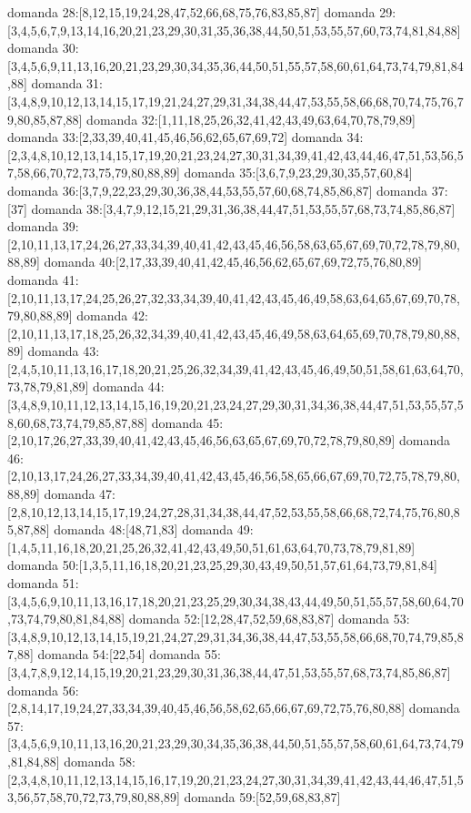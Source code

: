 domanda 28:[8,12,15,19,24,28,47,52,66,68,75,76,83,85,87]
domanda 29:[3,4,5,6,7,9,13,14,16,20,21,23,29,30,31,35,36,38,44,50,51,53,55,57,60,73,74,81,84,88]
domanda 30:[3,4,5,6,9,11,13,16,20,21,23,29,30,34,35,36,44,50,51,55,57,58,60,61,64,73,74,79,81,84,88]
domanda 31:[3,4,8,9,10,12,13,14,15,17,19,21,24,27,29,31,34,38,44,47,53,55,58,66,68,70,74,75,76,79,80,85,87,88]
domanda 32:[1,11,18,25,26,32,41,42,43,49,63,64,70,78,79,89]
domanda 33:[2,33,39,40,41,45,46,56,62,65,67,69,72]
domanda 34:[2,3,4,8,10,12,13,14,15,17,19,20,21,23,24,27,30,31,34,39,41,42,43,44,46,47,51,53,56,57,58,66,70,72,73,75,79,80,88,89]
domanda 35:[3,6,7,9,23,29,30,35,57,60,84]
domanda 36:[3,7,9,22,23,29,30,36,38,44,53,55,57,60,68,74,85,86,87]
domanda 37:[37]
domanda 38:[3,4,7,9,12,15,21,29,31,36,38,44,47,51,53,55,57,68,73,74,85,86,87]
domanda 39:[2,10,11,13,17,24,26,27,33,34,39,40,41,42,43,45,46,56,58,63,65,67,69,70,72,78,79,80,88,89]
domanda 40:[2,17,33,39,40,41,42,45,46,56,62,65,67,69,72,75,76,80,89]
domanda 41:[2,10,11,13,17,24,25,26,27,32,33,34,39,40,41,42,43,45,46,49,58,63,64,65,67,69,70,78,79,80,88,89]
domanda 42:[2,10,11,13,17,18,25,26,32,34,39,40,41,42,43,45,46,49,58,63,64,65,69,70,78,79,80,88,89]
domanda 43:[2,4,5,10,11,13,16,17,18,20,21,25,26,32,34,39,41,42,43,45,46,49,50,51,58,61,63,64,70,73,78,79,81,89]
domanda 44:[3,4,8,9,10,11,12,13,14,15,16,19,20,21,23,24,27,29,30,31,34,36,38,44,47,51,53,55,57,58,60,68,73,74,79,85,87,88]
domanda 45:[2,10,17,26,27,33,39,40,41,42,43,45,46,56,63,65,67,69,70,72,78,79,80,89]
domanda 46:[2,10,13,17,24,26,27,33,34,39,40,41,42,43,45,46,56,58,65,66,67,69,70,72,75,78,79,80,88,89]
domanda 47:[2,8,10,12,13,14,15,17,19,24,27,28,31,34,38,44,47,52,53,55,58,66,68,72,74,75,76,80,85,87,88]
domanda 48:[48,71,83]
domanda 49:[1,4,5,11,16,18,20,21,25,26,32,41,42,43,49,50,51,61,63,64,70,73,78,79,81,89]
domanda 50:[1,3,5,11,16,18,20,21,23,25,29,30,43,49,50,51,57,61,64,73,79,81,84]
domanda 51:[3,4,5,6,9,10,11,13,16,17,18,20,21,23,25,29,30,34,38,43,44,49,50,51,55,57,58,60,64,70,73,74,79,80,81,84,88]
domanda 52:[12,28,47,52,59,68,83,87]
domanda 53:[3,4,8,9,10,12,13,14,15,19,21,24,27,29,31,34,36,38,44,47,53,55,58,66,68,70,74,79,85,87,88]
domanda 54:[22,54]
domanda 55:[3,4,7,8,9,12,14,15,19,20,21,23,29,30,31,36,38,44,47,51,53,55,57,68,73,74,85,86,87]
domanda 56:[2,8,14,17,19,24,27,33,34,39,40,45,46,56,58,62,65,66,67,69,72,75,76,80,88]
domanda 57:[3,4,5,6,9,10,11,13,16,20,21,23,29,30,34,35,36,38,44,50,51,55,57,58,60,61,64,73,74,79,81,84,88]
domanda 58:[2,3,4,8,10,11,12,13,14,15,16,17,19,20,21,23,24,27,30,31,34,39,41,42,43,44,46,47,51,53,56,57,58,70,72,73,79,80,88,89]
domanda 59:[52,59,68,83,87]
